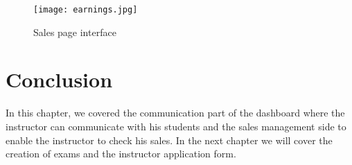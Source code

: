 \hfill \break
\hfill \break

\begin{figure}[!ht]
    \centering
    \texttt{[image: earnings.jpg]}
    \caption{Sales page interface}
    \label{fig:earnings}
\end{figure}


\vfill
\clearpage

\section*{Conclusion}
In this chapter, we covered the communication part of the dashboard where the instructor can communicate with his students and the sales management side to enable the instructor to check his sales. In the next chapter we will cover the creation of exams and the instructor application form.

